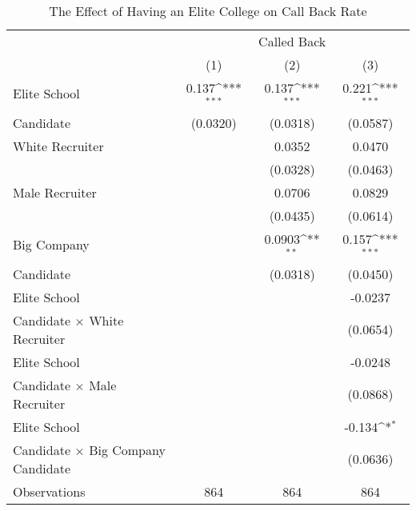 \begin{table}[htbp]\centering
\def\sym#1{\ifmmode^{#1}\else\(^{#1}\)\fi}
\caption{\label{tab:assignment1} The Effect of Having an Elite College on Call Back Rate}
\begin{tabular*}{\hsize}{@{\hskip\tabcolsep\extracolsep\fill}l*{3}{c}}
\hline\hline
                    &\multicolumn{3}{c}{Called Back}                                  \\
                    &\multicolumn{1}{c}{(1)}         &\multicolumn{1}{c}{(2)}         &\multicolumn{1}{c}{(3)}         \\
\hline
Elite School        &       0.137\sym{***}&       0.137\sym{***}&       0.221\sym{***}\\
Candidate           &    (0.0320)         &    (0.0318)         &    (0.0587)         \\
[1em]
White Recruiter     &                     &      0.0352         &      0.0470         \\
                    &                     &    (0.0328)         &    (0.0463)         \\
[1em]
Male Recruiter      &                     &      0.0706         &      0.0829         \\
                    &                     &    (0.0435)         &    (0.0614)         \\
[1em]
Big Company         &                     &      0.0903\sym{**} &       0.157\sym{***}\\
Candidate           &                     &    (0.0318)         &    (0.0450)         \\
[1em]
Elite School        &                     &                     &     -0.0237         \\
Candidate $\times$ White Recruiter&                     &                     &    (0.0654)         \\
[1em]
Elite School        &                     &                     &     -0.0248         \\
Candidate $\times$ Male Recruiter&                     &                     &    (0.0868)         \\
[1em]
Elite School        &                     &                     &      -0.134\sym{*}  \\
Candidate $\times$ Big Company Candidate&                     &                     &    (0.0636)         \\
\hline
Observations        &         864         &         864         &         864         \\

\end{tabular*}
\end{table}
